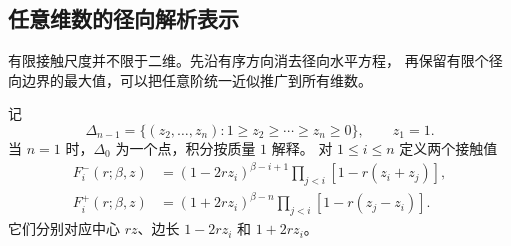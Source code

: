 
\subsection{任意维数的径向解析表示}

有限接触尺度并不限于二维。先沿有序方向消去径向水平方程，
再保留有限个径向边界的最大值，可以把任意阶统一近似推广到所有维数。

记
\[
 \Delta_{n-1}=\{(z_2,\ldots,z_n):1\ge z_2\ge\cdots\ge z_n\ge0\},
 \qquad z_1=1.
\]
当 $n=1$ 时，$\Delta_0$ 为一个点，积分按质量 $1$ 解释。
对 $1\le i\le n$ 定义两个接触值
\begin{align*}
 F_i^-(r;\beta,z)&=(1-2rz_i)^{\beta-i+1}
                  \prod_{j<i}[1-r(z_i+z_j)],\\
 F_i^+(r;\beta,z)&=(1+2rz_i)^{\beta-n}
                  \prod_{j<i}[1-r(z_j-z_i)].
\end{align*}
它们分别对应中心 $rz$、边长 $1-2rz_i$ 和 $1+2rz_i$。

